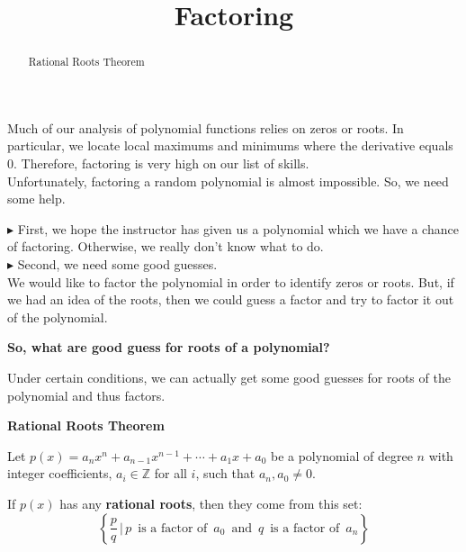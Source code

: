 \documentclass{ximera}
\title{Factoring}
\begin{document}
\begin{abstract}
Rational Roots Theorem
\end{abstract}
\maketitle




Much of our analysis of polynomial functions relies on zeros or roots. In particular, we locate local maximums and minimums where the derivative equals $0$.  Therefore, factoring is very high on our list of skills. \\

Unfortunately, factoring a random polynomial is almost impossible.  So, we need some help.


$\blacktriangleright$ First, we hope the instructor has given us a polynomial which we have a chance of factoring.  Otherwise, we really don't know what to do. \\




$\blacktriangleright$ Second, we need some good guesses. \\


We would like to factor the polynomial in order to identify zeros or roots.  But, if we had an idea of the roots, then we could guess a factor and try to factor it out of the polynomial. \\

\begin{center}
\textbf{\textcolor{red!80!black}{So, what are good guess for roots of a polynomial?}}
\end{center}


Under certain conditions, we can actually get some good guesses for roots of the polynomial and thus factors.






\begin{theorem} \textbf{\textcolor{green!50!black}{Rational Roots Theorem}} 



Let $p(x) = a_n x^n + a_{n-1} x^{n-1} + \cdots + a_1 x + a_0$ be a polynomial of degree $n$ with integer coefficients, $a_i \in \mathbb{Z}$ for all $i$, such that $a_n, a_0 \ne 0$.

If $p(x)$ has any \textbf{rational roots}, then they come from this set: 
\[
\left\{ \frac{p}{q} \, | \, p \, \text{ is a factor of } \, a_0 \, \text{ and } \, q \, \text{ is a factor of } \, a_n  \right\}
\]



\end{theorem}
\end{document}
